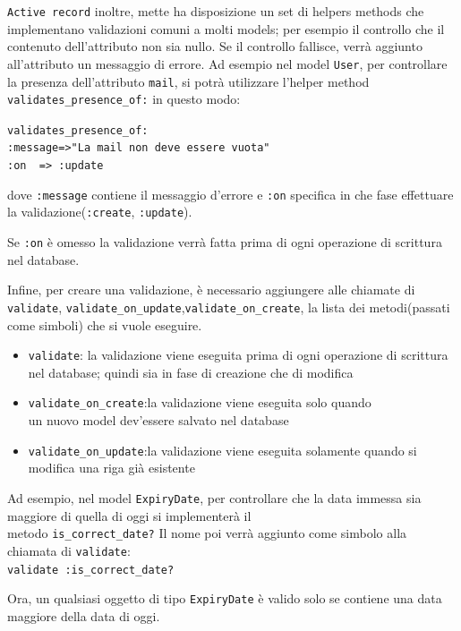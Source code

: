\documentclass[11pt,a4paper]{article}
\begin{document}
\verb|Active record| inoltre, mette ha disposizione un set di helpers methods che implementano validazioni comuni a molti models; per esempio il controllo che il contenuto dell'attributo non sia nullo.
Se il controllo fallisce, verrà aggiunto all'attributo un messaggio di errore.
Ad esempio nel model \verb|User|, per controllare la presenza dell'attributo \verb|mail|, si potrà utilizzare l'helper method \verb|validates_presence_of:| in questo modo:\\
\begin{center}
 \verb|validates_presence_of:|\\
 \verb|:message=>"La mail non deve essere vuota"|\\
 \verb|:on  => :update|\\
\end{center}
dove \verb|:message| contiene il messaggio d'errore e \verb|:on| specifica in che fase effettuare la validazione(\verb|:create|, \verb|:update|).

 
Se \verb|:on| è omesso la validazione verrà fatta prima di ogni operazione di scrittura nel database.


Infine, per creare una validazione, è necessario aggiungere alle chiamate di \verb|validate|, \verb|validate_on_update|,\verb|validate_on_create|, la lista dei metodi(passati come simboli) che si vuole eseguire.
\begin{itemize}
 \item \verb|validate|: la validazione viene eseguita prima di ogni operazione di scrittura nel database; quindi sia in fase di creazione che di modifica
 \item \verb|validate_on_create|:la validazione viene eseguita solo quando\\ un nuovo model dev'essere salvato nel database
 \item \verb|validate_on_update|:la validazione viene eseguita solamente quando si modifica una riga già esistente
\end{itemize}


Ad esempio, nel model \verb|ExpiryDate|, per controllare che la data immessa sia maggiore di quella di oggi si implementerà il \\metodo \verb|is_correct_date?|
Il nome poi verrà aggiunto come simbolo alla chiamata di \verb|validate|:\\
\verb|validate :is_correct_date?|


Ora, un qualsiasi oggetto di tipo \verb|ExpiryDate| è valido solo se contiene una data maggiore della data di oggi.
\end{document}
